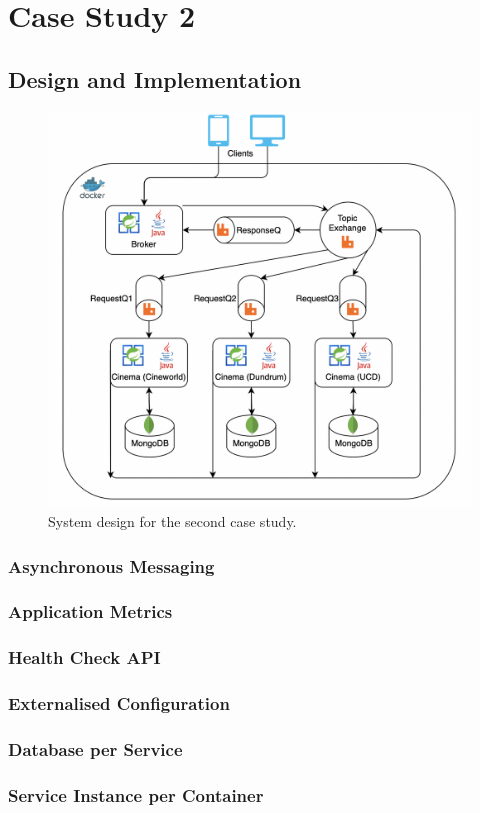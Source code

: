 \section{Case Study 2}



\subsection{Design and Implementation}

\begin{figure}[H]
  \centering
  \includegraphics[width=0.6\linewidth]{./assets/diagrams/cs02-arch.png}
  \caption{System design for the second case study.}
  \label{fig:cs02-arch}
\end{figure}

\subsubsection{Asynchronous Messaging}
\subsubsection{Application Metrics}
\subsubsection{Health Check API}
\subsubsection{Externalised Configuration}
\subsubsection{Database per Service}
\subsubsection{Service Instance per Container}


